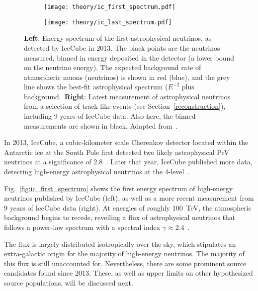 \begin{figure}[htb]
    \centering
    \begin{subfigure}[b]{0.52\textwidth}
        \centering
        \texttt{[image: theory/ic\_first\_spectrum.pdf]}
    \end{subfigure}
    \begin{subfigure}[b]{0.47\textwidth}
        \centering
        \texttt{[image: theory/ic\_last\_spectrum.pdf]}
    \end{subfigure}
    \caption[Astrophysical neutrino spectrum]{\textbf{Left}: Energy spectrum of the first astrophysical neutrinos, as detected by IceCube in 2013. The black points are the neutrinos measured, binned in energy deposited in the detector (a lower bound on the neutrino energy). The expected background rate of atmospheric muons (neutrinos) is shown in red (blue), and the grey line shows the best-fit astrophysical spectrum ($E^{-2}$ plus background.\ \textbf{Right}: Latest measurement of astrophysical neutrinos from a selection of track-like events (see Section~\ref{reconstruction}), including 9 years of IceCube data. Also here, the binned measurements are shown in black. Adapted from~\cite{Aartsen2013,Abbasi2022b}.}
\end{figure}

In 2013, IceCube, a cubic-kilometer scale Cherenkov detector located within the Antarctic ice at the South Pole first detected two likely astrophysical \unit{\peta\eV} neutrinos at a significance of \SI{2.8}{\sigma}~. Later that year, IceCube published more data, detecting high-energy astrophysical neutrinos at the \SI{4}{\sigma}-level~.

Fig.~\ref{fig:ic_first_spectrum} shows the first energy spectrum of high-energy neutrinos published by IceCube (left), as well as a more recent measurement from 9 years of IceCube data (right). At energies of roughly \SI{100}{\tera\eV}, the atmospheric background begins to recede, reveiling a flux of astrophysical neutrinos that follows a power-law spectrum with a spectral index $\gamma\approx2.4$~.

The flux is largely distributed isotropically over the sky, which stipulates an extra-galactic origin for the majority of high-energy neutrinos. The majority of this flux is still unaccounted for. Nevertheless, there are some prominent source candidates found since 2013. These, as well as upper limits on other hypothesized source populations, will be discussed next.

